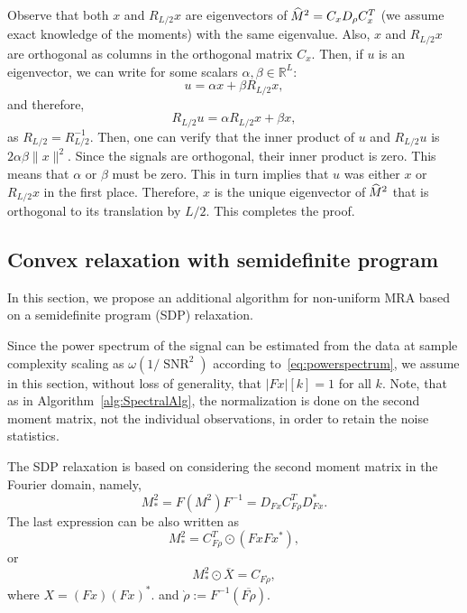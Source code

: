 \documentclass{IEEEtran}
\numberwithin{equation}{section}
\numberwithin{figure}{section}
\theoremstyle{plain}
\theoremstyle{definition}
\theoremstyle{remark}
\theoremstyle{plain}
\theoremstyle{remark}
\theoremstyle{plain}
\theoremstyle{plain}
\theoremstyle{remark}
\newcommand{\RL}{\mathbb{R}^L}
\newcommand{\F}{F}
\newcommand{\SNR}{\operatorname{SNR}}
\newcommand{\hatM}{\widehat{\hspace{-1pt}M}\phantom{\hspace{-11pt}M}}
\begin{document}
Observe that both $x$ and $R_{L/2}x$ are eigenvectors of $\hatM^2= C_xD_\rho  C_x^T$ (we assume exact knowledge of the moments) with the same eigenvalue. Also, $x$ and $R_{L/2} x$ are orthogonal as columns in the orthogonal matrix $C_{x}$. Then, if $u$ is an eigenvector, we can write for some scalars $\alpha,\beta\in\RL$:
\[ u = \alpha x+ \beta R_{L/2} x  , \]
and therefore,
\[  R_{L/2}u = \alpha R_{L/2} x + \beta x , \]
as $R_{L/2} = R_{L/2}^{-1}$. Then, one can verify that the inner product of $u$ and $R_{L/2}u$ is $2\alpha \beta \|x\|^2$. Since the signals are orthogonal, their inner product is zero. This means that $\alpha$ or $\beta$ must be zero. This in turn implies that $u$ was either $x$ or $R_{L/2} x$ in the first place. Therefore, $x$ is the unique eigenvector of $\hatM^2$ that is orthogonal to its translation by $L/2$. This completes the proof.

\subsection{Convex relaxation with semidefinite program } \label{subsec:SDPmethod}

In this section, we propose an additional algorithm for non-uniform MRA based on a semidefinite program (SDP) relaxation.

Since the power spectrum of the signal can be estimated from the data at sample complexity scaling as $\omega(1/\SNR^2)$ according to~\eqref{eq:powerspectrum}, we assume in this section, without loss of generality, that $\vert \F x\vert[k] =1$ for all $k$. Note, that as in Algorithm~\ref{alg:SpectralAlg}, the normalization is done on the second moment matrix, not the individual observations, in order to retain the noise statistics.

The SDP relaxation is based on considering the second moment matrix in the Fourier domain, namely,
\begin{equation} \label{eq:My_prime} 
M^2_\ast = \F\left( M^2 \right) \F^{-1} = D_{\F x} C_{\F \rho }^T D_{\F x}^\ast. 
\end{equation}
The last expression can be also written as 
\begin{equation*} 
M^2_\ast =  C_{\F \rho }^T \odot (\F x \F x{^\ast}),  
\end{equation*}
or 
\begin{equation}  \label{eq:1}
M^2_\ast \odot \overline{X}=  C_{\F \grave\rho },
\end{equation}
where $X = (\F x) (\F x)^\ast$. and $\grave\rho :=\F ^{-1}(\overline{\F {\rho}})$. 
\end{document}
